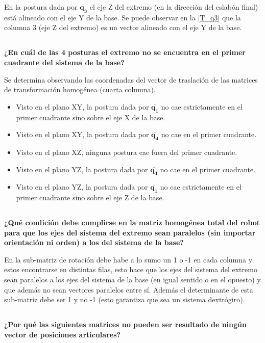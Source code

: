 \documentclass[a4paper,12pt]{article}
\begin{document}
En la postura dada por $\mathbf{\overline{q_3}}$ el eje Z del extremo (en la dirección del eslabón final)
está alineado con el eje Y de la base. Se puede observar en la \cref{T_q3} que la columna
3 (eje Z del extremo) es un vector alineado con el eje Y de la base.

\subsection{}
\textbf{¿En cuál de las 4 posturas el extremo no se encuentra en el primer cuadrante del
sistema de la base?}

Se determina observando las coordenadas del vector de traslación de las matrices de transformación homogénea (cuarta columna).
\begin{itemize}
    \item Visto en el plano XY, la postura dada por $\mathbf{\overline{q_1}}$ no cae estrictamente en el primer cuadrante sino sobre el eje X de la base.
    \item Visto en el plano XY, la postura dada por $\mathbf{\overline{q_4}}$ no cae en el primer cuadrante.
    \item Visto en el plano XZ, ninguna postura cae fuera del primer cuadrante.
    \item Visto en el plano YZ, la postura dada por $\mathbf{\overline{q_4}}$ no cae en el primer cuadrante.
    \item Visto en el plano YZ, la postura dada por $\mathbf{\overline{q_1}}$ no cae estrictamente en el primer cuadrante sino sobre el eje Z de la base.
\end{itemize}

\subsection{}
\textbf{¿Qué condición debe cumplirse en la matriz homogénea total del robot para que los
ejes del sistema del extremo sean paralelos (sin importar orientación ni orden) a los
del sistema de la base?}

En la sub-matriz de rotación debe habe a lo sumo un 1 o -1 en cada columna y estos encontrarse en distintas filas, esto hace que los ejes del sistema del extremo sean paralelos a los ejes del sistema de la base (en igual sentido o en el opuesto)
y que además no sean vectores paralelos entre sí.
Además el determinante de esta sub-matriz debe ser 1 y no -1 (esto garantiza que sea un sistema dextrógiro).

\subsection{}
\textbf{¿Por qué las siguientes matrices no pueden ser resultado de ningún vector de
posiciones articulares?}
\end{document}
